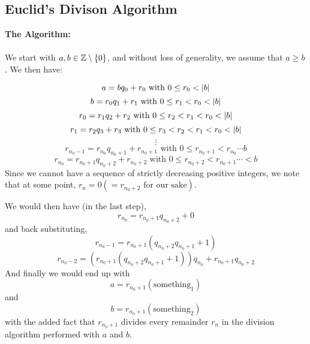 \documentclass[../Main.tex]{subfiles}
\begin{document}
\subsection{Euclid's Divison Algorithm}
\textbf{The Algorithm:}
\\\\ We start with $a,b \in \mathbb Z \setminus \{ 0\}$, and without loss of 
generality, we assume that $a\geq b$. We then have:

$$\centering{a=bq_0+r_0} \text{ with } 0 \leq r_0<|b|$$
$$\centering{b=r_0q_1+r_1} \text{ with } 0 \leq r_1<r_0<|b|$$
$$\centering{r_0=r_1q_2+r_2} \text{ with } 0 \leq r_2<r_1<r_0<|b|$$
$$\centering{r_1=r_2q_3+r_3} \text{ with } 0 \leq r_3<r_2<r_1<r_0<|b|$$
$$\vdots$$
$$r_{n_0-1}=r_{n_0}q_{n_0+1}+r_{n_0+1} \text{ with } 0 \leq r_{n_0+1}<r_{n_0} \cdots b $$
$$r_{n_0}=r_{n_0+1}q_{n_0+2}+r_{n_0+2} \text{ with } 0 \leq r_{n_0+2}<r_{n_0+1} \cdots <b$$
Since we cannot have a sequence of strictly decreasing positive integers, we note that at some point, $r_{n}=0(=r_{n_0+2} \text{ for our sake})$. 

We would then have (in the last step), $$r_{n_0}=r_{n_0+1}q_{n_0+2}+0$$ and back substituting,
$$r_{n_0-1}=r_{n_0+1}(q_{n_0+2}q_{n_0+1}+1)$$
$$r_{n_0-2}=(r_{n_0+1}(q_{n_0+2}q_{n_0+1}+1))q_{n_0}+r_{n_0+1}q_{n_0+2} $$
And finally we would end up with $$a=r_{n_0+1}(\text{something}_1) $$
and $$b=r_{n_0+1}(\text{something}_2) $$ with the added fact that $r_{n_0+1}$ divides every remainder $r_n$ in the division algorithm performed with $a$ and $b$. 
\end{document}
